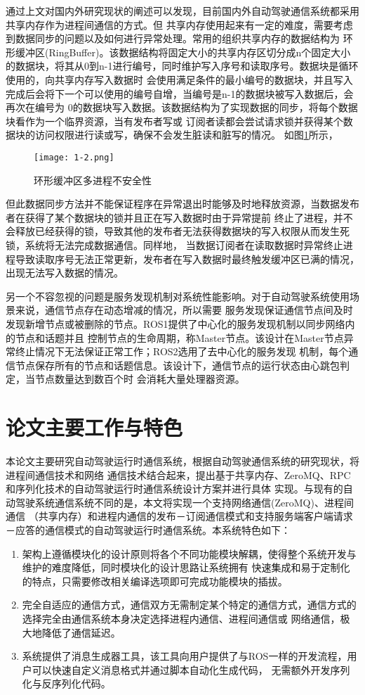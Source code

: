 通过上文对国内外研究现状的阐述可以发现，目前国内外自动驾驶通信系统都采用共享内存作为进程间通信的方式。但
共享内存使用起来有一定的难度，需要考虑到数据同步的问题以及如何进行异常处理。常用的组织共享内存的数据结构为
环形缓冲区(RingBuffer)。该数据结构将固定大小的共享内存区切分成n个固定大小的数据块，将其从0到n-1进行编号，同时维护写入序号和读取序号。数据块是循环使用的，向共享内存写入数据时
会使用满足条件的最小编号的数据块，并且写入完成后会将下一个可以使用的编号自增，当编号是n-1的数据块被写入数据后，会再次在编号为
0的数据块写入数据。该数据结构为了实现数据的同步，将每个数据块看作为一个临界资源，当有发布者写或
订阅者读都会尝试请求锁并获得某个数据块的访问权限进行读或写，确保不会发生脏读和脏写的情况。
如图\ref{ringbuffer}\cite{9235068}所示，
\begin{figure}[htb]
  \centering
  \texttt{[image: 1-2.png]}
  \caption{环形缓冲区多进程不安全性}
  \label{ringbuffer}
\end{figure}
但此数据同步方法并不能保证程序在异常退出时能够及时地释放资源，当数据发布者在获得了某个数据块的锁并且正在写入数据时由于异常提前
终止了进程，并不会释放已经获得的锁，导致其他的发布者无法获得数据块的写入权限从而发生死锁，系统将无法完成数据通信。同样地，
当数据订阅者在读取数据时异常终止进程导致读取序号无法正常更新，发布者在写入数据时最终触发缓冲区已满的情况，出现无法写入数据的情况。

另一个不容忽视的问题是服务发现机制对系统性能影响。对于自动驾驶系统使用场景来说，通信节点存在动态增减的情况，所以需要
服务发现保证通信节点间及时发现新增节点或被删除的节点。ROS1提供了中心化的服务发现机制以同步网络内的节点和话题并且
控制节点的生命周期，称Master节点。该设计在Master节点异常终止情况下无法保证正常工作；ROS2选用了去中心化的服务发现
机制，每个通信节点保存所有的节点和话题信息。该设计下，通信节点的运行状态由心跳包判定，当节点数量达到数百个时
会消耗大量处理器资源\cite{9355690}。


\section{论文主要工作与特色}
本论文主要研究自动驾驶运行时通信系统，根据自动驾驶通信系统的研究现状，将进程间通信技术和网络
通信技术结合起来，提出基于共享内存、ZeroMQ、RPC和序列化技术的自动驾驶运行时通信系统设计方案并进行具体
实现。与现有的自动驾驶系统通信系统不同的是，本文将实现一个支持网络通信(ZeroMQ)、进程间通信
（共享内存）和进程内通信的发布－订阅通信模式和支持服务端客户端请求－应答的通信模式的自动驾驶运行时通信系统。本系统特色如下：
\begin{enumerate}
  \item 架构上遵循模块化的设计原则将各个不同功能模块解耦，使得整个系统开发与维护的难度降低，同时模块化的设计思路让系统拥有
  快速集成和易于定制化的特点，只需要修改相关编译选项即可完成功能模块的插拔。
  \item 完全自适应的通信方式，通信双方无需制定某个特定的通信方式，通信方式的选择完全由通信系统本身决定选择进程内通信、进程间通信或
  网络通信，极大地降低了通信延迟。
  \item 系统提供了消息生成器工具，该工具向用户提供了与ROS一样的开发流程，用户可以快速自定义消息格式并通过脚本自动化生成代码，
  无需额外开发序列化与反序列化代码。  
\end{enumerate}

